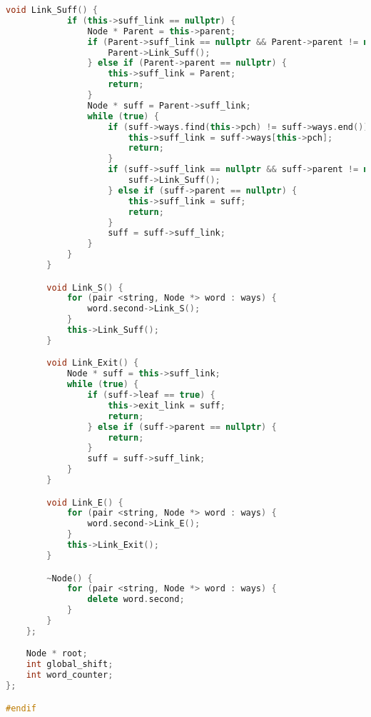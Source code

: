 \begin{lstlisting}[language=C++]
        void Link_Suff() {
            if (this->suff_link == nullptr) {
                Node * Parent = this->parent;
                if (Parent->suff_link == nullptr && Parent->parent != nullptr) {
                    Parent->Link_Suff();
                } else if (Parent->parent == nullptr) {
                    this->suff_link = Parent;
                    return;
                }
                Node * suff = Parent->suff_link;
                while (true) {
                    if (suff->ways.find(this->pch) != suff->ways.end()) {
                        this->suff_link = suff->ways[this->pch];
                        return;
                    }
                    if (suff->suff_link == nullptr && suff->parent != nullptr) {
                        suff->Link_Suff();
                    } else if (suff->parent == nullptr) {
                        this->suff_link = suff;
                        return;
                    }
                    suff = suff->suff_link;
                }
            }
        }

        void Link_S() {
            for (pair <string, Node *> word : ways) {
                word.second->Link_S();
            }
            this->Link_Suff();
        }

        void Link_Exit() {
            Node * suff = this->suff_link;
            while (true) {
                if (suff->leaf == true) {
                    this->exit_link = suff;
                    return;
                } else if (suff->parent == nullptr) {
                    return;
                }
                suff = suff->suff_link;
            }
        }

        void Link_E() {
            for (pair <string, Node *> word : ways) {
                word.second->Link_E();
            }
            this->Link_Exit();
        }

        ~Node() {
            for (pair <string, Node *> word : ways) {
                delete word.second;
            }
        }
    };

    Node * root;
    int global_shift;
    int word_counter;
};

#endif

\end{lstlisting}

\pagebreak

